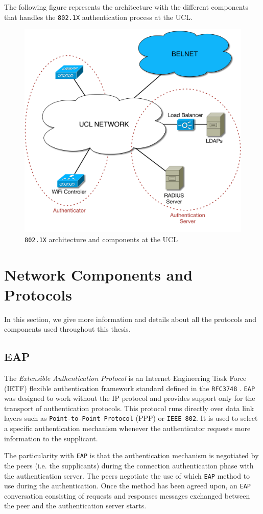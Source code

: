 The following figure represents the architecture with the different components that handles the \texttt{802.1X} authentication process at the UCL. 

\begin{figure}[H]
	\center
	\includegraphics[width=0.7\linewidth]{Pictures/chapter2/802-archi.png}
	\caption{\texttt{802.1X} architecture and components at the UCL}
\end{figure}



\section{Network Components and Protocols}
In this section, we give more information and details about all the protocols and components used throughout this thesis.

\subsection{EAP}
The \textit{Extensible Authentication Protocol} is an Internet Engineering Task Force (IETF) flexible authentication framework standard defined in the \texttt{RFC3748} \cite{rfc3748}. \texttt{EAP} was designed to work without the IP protocol and provides support only for the transport of authentication protocols. This protocol runs directly over data link layers such as \texttt{Point-to-Point Protocol} (PPP) or \texttt{IEEE 802}. It is used to select a specific authentication mechanism whenever the authenticator requests more information to the supplicant.

The particularity with \texttt{EAP} is that the authentication mechanism is negotiated by the peers (i.e. the supplicants) during the connection authentication phase with the authentication server. The peers negotiate the use of which \texttt{EAP} method to use during the authentication. Once the method has been agreed upon, an \texttt{EAP} conversation consisting of requests and responses messages exchanged between the peer and the authentication server starts.

